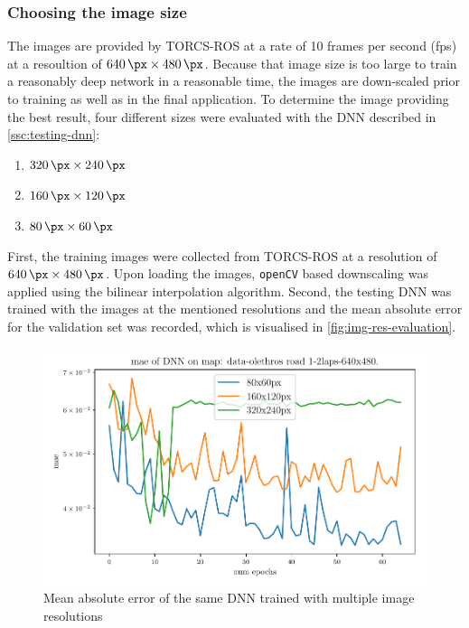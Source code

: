 \documentclass[10pt,a4paper,twoside,journal]{IEEEtran}
\begin{document}
\subsubsection{Choosing the image size}
The images are provided by TORCS-ROS \cite{mirus_torcs-ros_2017} at a rate of 10 frames per second (fps) at a resoultion of $ \SI{640}{\px} \times \SI{480}{\px} $. Because that image size is too large
to train a reasonably deep network in a reasonable time, the images are down-scaled prior to training as well as in the final application. To determine the image providing the best result, four different sizes were evaluated with the DNN described in \autoref{ssc:testing-dnn}: 
\begin{enumerate}
	\item $ \SI{320}{\px} \times \SI{240}{\px} $
	\item $ \SI{160}{\px} \times \SI{120}{\px} $
	\item $ \SI{80}{\px} \times \SI{60}{\px} $
\end{enumerate}
First, the training images were collected from TORCS-ROS at a resolution of $ \SI{640}{\px}\times \SI{480}{\px}$. Upon loading the images, \texttt{openCV} based downscaling was applied using the bilinear interpolation algorithm. Second, the testing DNN was trained with the images at the mentioned resolutions and the mean absolute error 
for the validation set was recorded, which is visualised in \autoref{fig:img-res-evaluation}.
\begin{figure}[ht]
	\centering
	\includegraphics[width=\columnwidth]{attachments/alexnet-val_mae-img_size_compare-09042-12547-22111.pdf}
	\caption{Mean absolute error of the same DNN trained with multiple image resolutions}
	\label{fig:img-res-evaluation}
\end{figure}
\end{document}
